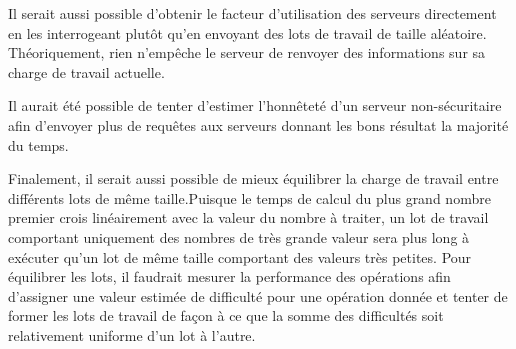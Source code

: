 Il serait aussi possible d'obtenir le facteur d'utilisation des serveurs directement en les interrogeant plutôt qu'en envoyant des lots de travail de taille 
aléatoire. Théoriquement, rien n'empêche le serveur de renvoyer des informations sur sa charge de travail actuelle.

Il aurait été possible de tenter d'estimer l'honnêteté d'un serveur non-sécuritaire afin d'envoyer plus de requêtes aux serveurs donnant les bons résultat la majorité du temps. 

Finalement, il serait aussi possible de mieux équilibrer la charge de travail entre différents lots de même taille.Puisque le temps de calcul du plus grand nombre premier crois linéairement avec la valeur du nombre à traiter, un lot de travail comportant uniquement des nombres de très grande valeur sera plus long à exécuter qu'un lot de même taille comportant des valeurs très petites. Pour équilibrer les lots, il faudrait mesurer la performance des opérations afin d'assigner une valeur estimée de difficulté pour une opération donnée et tenter de former les lots de travail de façon à ce que la somme des difficultés soit relativement uniforme d'un lot à l'autre. 




%
%
%
%
%
%
